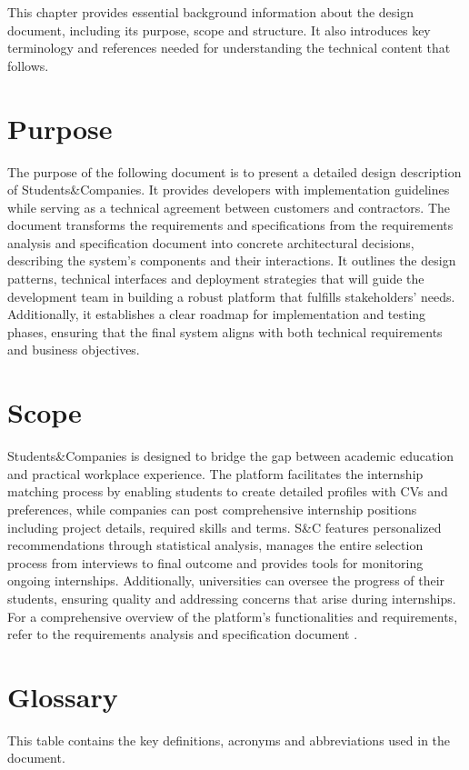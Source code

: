 This chapter provides essential background information about the design document, including its purpose, scope and structure.
It also introduces key terminology and references needed for understanding the technical content that follows.

\section{Purpose}
The purpose of the following document is to present a detailed design description of Students\&Companies.
It provides developers with implementation guidelines while serving as a technical agreement between customers and contractors.
The document transforms the requirements and specifications from the requirements analysis and specification document \cite{carraracurrodossi2024} into concrete architectural decisions, describing the system's components and their interactions.
It outlines the design patterns, technical interfaces and deployment strategies that will guide the development team in building a robust platform that fulfills stakeholders' needs.
Additionally, it establishes a clear roadmap for implementation and testing phases, ensuring that the final system aligns with both technical requirements and business objectives.

\section{Scope}
Students\&Companies is designed to bridge the gap between academic education and practical workplace experience.
The platform facilitates the internship matching process by enabling students to create detailed profiles with CVs and preferences, while companies can post comprehensive internship positions including project details, required skills and terms.
S\&C features personalized recommendations through statistical analysis, manages the entire selection process from interviews to final outcome and provides tools for monitoring ongoing internships.
Additionally, universities can oversee the progress of their students, ensuring quality and addressing concerns that arise during internships.
For a comprehensive overview of the platform's functionalities and requirements, refer to the requirements analysis and specification document \cite{carraracurrodossi2024}.

\section{Glossary}
This table contains the key definitions, acronyms and abbreviations used in the document.


